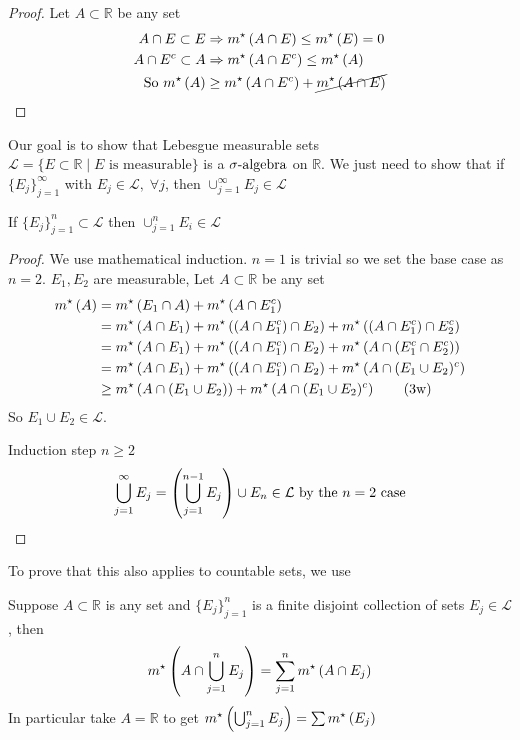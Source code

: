 \begin{proof}
    Let $A \subset \mathbb{R}$ be any set
    \begin{align*}
        A \cap E \subset E &\Rightarrow m^{\star}\left(A \cap E\right) \leq m^{\star}\left(E\right) = 0 \\
        A \cap E^{c} \subset A &\Rightarrow m^{\star}\left(A \cap E^{c}\right) \leq m^{\star}\left(A\right) \\
        \text{ So } m^{\star}\left(A\right) &\geq m^{\star}\left(A \cap E^c\right) + \cancel{m^{\star}\left(A \cap E\right)}
    \end{align*}
\end{proof}

Our goal is to show that Lebesgue measurable sets $\mathcal{L} = \{ E \subset \mathbb{R} \mid E \text{ is measurable} \}$ is a $\sigma\text{-algebra}$ on $\mathbb{R}$.
We just need to show that if $\{ E_j \}_{j=1}^{\infty}$ with $E_j \in \mathcal{L}, \; \forall j$, then $\cup_{j=1}^{\infty} E_j \in \mathcal{L}$

\begin{prop}
    If $\{ E_j \}_{j=1}^{n} \subset \mathcal{L}$ then $\cup_{j=1}^{n} E_i \in \mathcal{L}$
\end{prop}

\begin{proof}
    We use mathematical induction.
    $n=1$ is trivial so we set the base case as $n=2$.
    $E_1, E_2$ are measurable, Let $A \subset \mathbb{R}$ be any set
    \begin{align*}
        m^{\star}\left(A\right) &= m^{\star}\left(E_1 \cap A\right) + m^{\star}\left(A \cap E_1 ^{c}\right) \\
        &= m^{\star}\left(A \cap E_1\right) + m^{\star}\left((A \cap E_1^{c}) \cap E_2\right) + m^{\star}\left((A \cap E_1 ^{c}) \cap E_2 ^{c}\right) \\
        &= m^{\star}\left(A \cap E_1\right) + m^{\star}\left((A \cap E_1^{c}) \cap E_2\right) + m^{\star}\left(A \cap (E_1 ^{c} \cap E_2 ^{c})\right) \\
        &= m^{\star}\left(A \cap E_1\right) + m^{\star}\left((A \cap E_1^{c}) \cap E_2\right) + m^{\star}\left(A \cap (E_1 \cup E_2)^{c}\right)\\
        &\geq m^{\star}\left(A \cap (E_1 \cup E_2)\right) + m^{\star}\left(A \cap (E_1 \cup E_2)^{c}\right) \tag{3w} \\
    \end{align*}
    So $E_1 \cup E_2 \in \mathcal{L}$.

    Induction step $n \geq 2$
    \[
        \bigcup_{j=1}^{\infty} E_j = \left( \bigcup_{j=1}^{n-1} E_j \right) \cup E_n \in \mathcal{L} \text{ by the $n=2$ case} \qedhere
    \]
\end{proof}

To prove that this also applies to countable sets, we use
\begin{prop}
    Suppose $A \subset \mathbb{R}$ is any set and $\{ E_j \}_{j=1}^{n}$ is a finite disjoint collection of sets $E_j \in \mathcal{L}$, then
\[
    m^{\star}\left(A \cap \bigcup_{j=1}^{n} E_j\right) = \sum_{j=1}^{n} m^{\star}\left(A \cap E_j\right)
\]
    In particular take $A = \mathbb{R}$ to get $m^{\star}\left(\bigcup_{j=1}^{n}E_j\right) = \sum m^{\star}\left(E_j\right)$
\end{prop}

